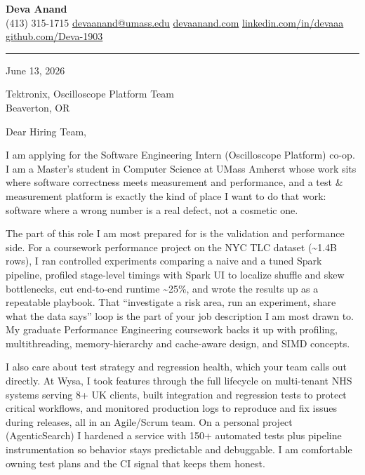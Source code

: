 \documentclass[letterpaper,11pt]{article}
\begin{document}
\begin{center}
    {\LARGE \bfseries \textcolor{ResumeNavy}{Deva Anand}} \\ \vspace{3pt}
    \small
    (413) 315-1715 \enspace\textbar\enspace
    \href{mailto:devaanand@umass.edu}{devaanand@umass.edu} \enspace\textbar\enspace
    \href{https://devaanand.com}{devaanand.com} \enspace\textbar\enspace
    \href{https://linkedin.com/in/devaaa/}{linkedin.com/in/devaaa} \enspace\textbar\enspace
    \href{https://github.com/Deva-1903}{github.com/Deva-1903}
\end{center}
\vspace{2pt}
\hrule
\vspace{10pt}

\noindent June 13, 2026

\noindent Tektronix, Oscilloscope Platform Team \\
Beaverton, OR

\vspace{4pt}
\noindent Dear Hiring Team,

I am applying for the Software Engineering Intern (Oscilloscope Platform) co-op. I am a Master's student in Computer Science at UMass Amherst whose work sits where software correctness meets measurement and performance, and a test \& measurement platform is exactly the kind of place I want to do that work: software where a wrong number is a real defect, not a cosmetic one.

The part of this role I am most prepared for is the validation and performance side. For a coursework performance project on the NYC TLC dataset (\textasciitilde1.4B rows), I ran controlled experiments comparing a naive and a tuned Spark pipeline, profiled stage-level timings with Spark UI to localize shuffle and skew bottlenecks, cut end-to-end runtime \textasciitilde25\%, and wrote the results up as a repeatable playbook. That ``investigate a risk area, run an experiment, share what the data says'' loop is the part of your job description I am most drawn to. My graduate Performance Engineering coursework backs it up with profiling, multithreading, memory-hierarchy and cache-aware design, and SIMD concepts.

I also care about test strategy and regression health, which your team calls out directly. At Wysa, I took features through the full lifecycle on multi-tenant NHS systems serving 8+ UK clients, built integration and regression tests to protect critical workflows, and monitored production logs to reproduce and fix issues during releases, all in an Agile/Scrum team. On a personal project (AgenticSearch) I hardened a service with 150+ automated tests plus pipeline instrumentation so behavior stays predictable and debuggable. I am comfortable owning test plans and the CI signal that keeps them honest.
\end{document}
